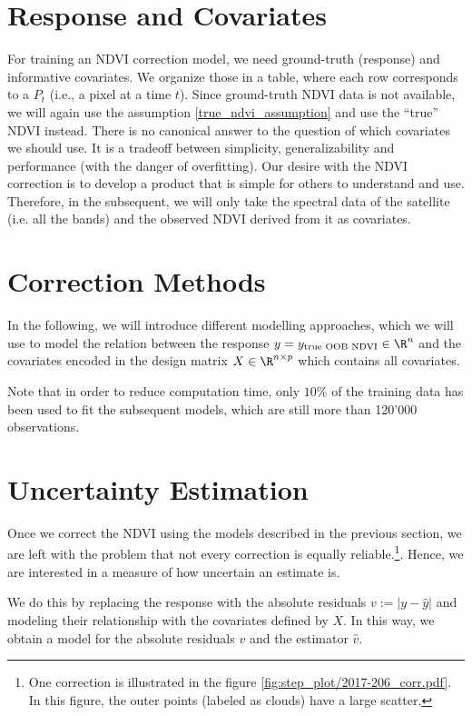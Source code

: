 \section{Response and Covariates}{
    \label{sec:corr_data_table}

    For training an NDVI correction model, we need ground-truth (response) and informative covariates. We organize those in a table, where each row corresponds to a $P_t$ (i.e., a pixel at a time $t$). 
    Since ground-truth NDVI data is not available, we will again use the assumption \ref{true_ndvi_assumption} and use the ``true'' NDVI instead. There is no canonical answer to the question of which covariates we should use. It is a tradeoff between simplicity, generalizability and performance (with the danger of overfitting). 
    Our desire with the NDVI correction is to develop a product that is simple for others to understand and use. Therefore, in the subsequent, we will only take the spectral data of the satellite (i.e. all the bands) and the observed NDVI derived from it as covariates. 
}    

\section{Correction Methods}{
    \label{sec:corr_methods}
    In the following, we will introduce different modelling approaches, which we will use to model the relation between the response $y = y_{\text{true OOB NDVI}}\in \R^n$ and the covariates encoded in the design matrix $X\in\R^{n \times p}$ which contains all covariates. 

    Note that in order to reduce computation time, only $10\%$ of the training data has been used to fit the subsequent models, which are still more than 120'000 observations. 
    
}

\section{Uncertainty Estimation}{
    \label{sec:corr_uncertainty}
    Once we correct the NDVI using the models described in the previous section, we are left with the problem that not every correction is equally reliable.\footnote{One correction is illustrated in the figure \ref{fig:step_plot/2017-206_corr.pdf}. In this figure, the outer points (labeled as clouds) have a large scatter.}. Hence, we are interested in a measure of how uncertain an estimate is. 

    We do this by replacing the response with the absolute residuals $v := \left|y -\hat y\right|$ and modeling their relationship with the covariates defined by $X$.  In this way, we obtain a model for the absolute residuals $v$ and the estimator $\hat v$.  
}

